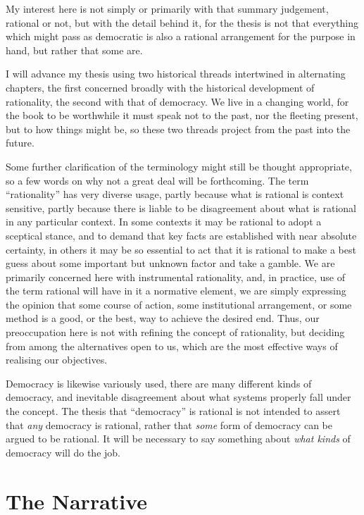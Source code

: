 My interest here is not simply or primarily with that summary judgement, rational or not, but with the detail behind it, for the thesis is not that everything which might pass as democratic is also a rational arrangement for the purpose in hand, but rather that some are.

I will advance my thesis using two historical threads intertwined in alternating chapters,
the first concerned broadly with the historical development of rationality, the second with that of democracy.
We live in a changing world, for the book to be worthwhile it must speak not to the past, nor the fleeting present, but to how things might be, so these two threads project from the past into the future.

Some further clarification of the terminology might still be thought appropriate, so a few words on why not a great deal will be forthcoming.
The term ``rationality'' has very diverse usage, partly because what is rational is context sensitive, partly because there is liable to be disagreement about what is rational in any particular context.
In some contexts it may be rational to adopt a sceptical stance, and to demand that key facts are established with near absolute certainty, in others it may be so essential to act that it is rational to make a best guess about some important but unknown factor and take a gamble.
We are primarily concerned here with instrumental rationality, and, in practice, use of the term rational will have in it a normative element, we are simply expressing the opinion that some course of action, some institutional arrangement, or some method is a good, or the best, way to achieve the desired end.
Thus, our preoccupation here is not with refining the concept of rationality, but deciding from among the alternatives open to us, which are the most effective ways of realising our objectives.

Democracy is likewise variously used, there are many different kinds of democracy, and inevitable disagreement about what systems properly fall under the concept.
The thesis that ``democracy'' is rational is not intended to assert that \emph{any} democracy is rational, rather that \emph{some} form of democracy can be argued to be rational.
It will be necessary to say something about \emph{what kinds} of democracy will do the job.

\section{The Narrative}

